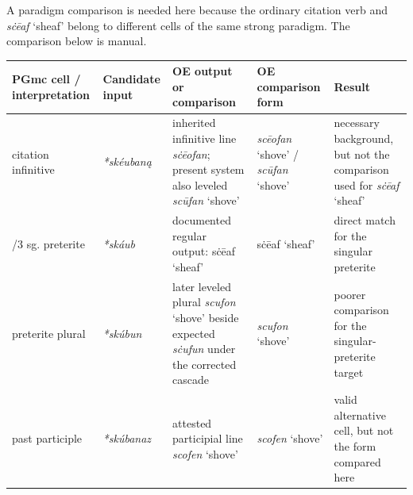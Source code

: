 \documentclass[
  british,
  a4paper,
]{article}
\newcounter{none} %
\begin{document}
A paradigm comparison is needed here because the ordinary citation verb
and {\emph{sċēaf}} `sheaf' belong to different cells of the same strong
paradigm. The comparison below is manual.

{\def\LTcaptype{none} %
\begin{longtable}[]{@{}
  >{\raggedright\arraybackslash}p{}
  >{\raggedright\arraybackslash}p{}
  >{\raggedright\arraybackslash}p{}
  >{\raggedright\arraybackslash}p{}
  >{\raggedright\arraybackslash}p{}@{}}
\toprule\noalign{}
\begin{minipage}[b]{\linewidth}\raggedright
PGmc cell / interpretation
\end{minipage} & \begin{minipage}[b]{\linewidth}\raggedright
Candidate input
\end{minipage} & \begin{minipage}[b]{\linewidth}\raggedright
OE output or comparison
\end{minipage} & \begin{minipage}[b]{\linewidth}\raggedright
OE comparison form
\end{minipage} & \begin{minipage}[b]{\linewidth}\raggedright
Result
\end{minipage} \\
\midrule\noalign{}
\endhead
\bottomrule\noalign{}
\endlastfoot
citation infinitive & {\emph{*skéubaną}} & inherited infinitive line
{\emph{sċēofan}}; present system also leveled {\emph{scūfan}} `shove' &
{\emph{scēofan}} `shove' / {\emph{scūfan}} `shove' & necessary
background, but not the comparison used for {\emph{sċēaf}} `sheaf' \\
1/3 sg. preterite & {\emph{*skáub}} & documented regular output: {sċēaf}
`sheaf' & {sċēaf} `sheaf' & direct match for the singular preterite \\
preterite plural & {\emph{*skúbun}} & later leveled plural
{\emph{scufon}} `shove' beside expected {\emph{sċufun}} under the
corrected cascade & {\emph{scufon}} `shove' & poorer comparison for the
singular-preterite target \\
past participle & {\emph{*skúbanaz}} & attested participial line
{\emph{scofen}} `shove' & {\emph{scofen}} `shove' & valid alternative
cell, but not the form compared here \\
\end{longtable}
}
\end{document}
